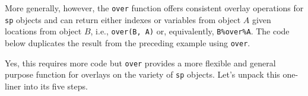 \documentclass[]{krantz}
\makeatletter
\newenvironment{Shaded}{\begin{snugshade}}{\end{snugshade}}
\newcommand{\FloatTok}[1]{\textcolor[rgb]{0.06,0.06,0.06}{#1}}
\newcommand{\KeywordTok}[1]{\textcolor[rgb]{0.27,0.27,0.27}{\textbf{#1}}}
\newcommand{\NormalTok}[1]{#1}
\newcommand{\OperatorTok}[1]{\textcolor[rgb]{0.43,0.43,0.43}{\textbf{#1}}}
\newcommand{\StringTok}[1]{\textcolor[rgb]{0.5,0.5,0.5}{#1}}
\newenvironment{kframe}{%
\medskip{}
\setlength{\fboxsep}{.8em}
 \def\at@end@of@kframe{}%
 \ifinner\ifhmode%
  \def\at@end@of@kframe{\end{minipage}}%
  \begin{minipage}{\columnwidth}%
 \fi\fi%
 \def\FrameCommand##1{\hskip\@totalleftmargin \hskip-\fboxsep
 \colorbox{shadecolor}{##1}\hskip-\fboxsep
     \hskip-\linewidth \hskip-\@totalleftmargin \hskip\columnwidth}%
 \MakeFramed {\advance\hsize-\width
   \@totalleftmargin\z@ \linewidth\hsize
   \@setminipage}}%
 {\par\unskip\endMakeFramed%
 \at@end@of@kframe}
\renewenvironment{Shaded}{\begin{kframe}}{\end{kframe}}
\makeatother
\begin{document}
More generally, however, the \texttt{over} function offers consistent overlay operations for \texttt{sp} objects and can return either indexes or variables from object \(A\) given locations from object \(B\), i.e., \texttt{over(B,\ A)} or, equivalently, \texttt{B\%over\%A}. The code below duplicates the result from the preceding example using \texttt{over}.

\begin{Shaded}
\end{Shaded}

Yes, this requires more code but \texttt{over} provides a more flexible and general purpose function for overlays on the variety of \texttt{sp} objects. Let's unpack this one-liner into its five steps.

\begin{Shaded}
\end{Shaded}
\end{document}
